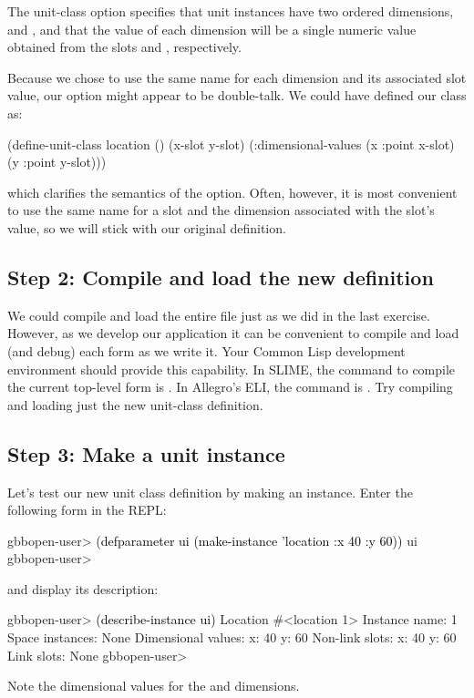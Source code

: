 \documentclass[10pt,twoside,english,pdftex]{article}
\begin{document}
The  unit-class option specifies that
 unit instances have two ordered dimensions, 
and , and that the value of each dimension will be a single
numeric value obtained from the slots  and ,
respectively.

Because we chose to use the same name for each dimension and its
associated slot value, our  option might
appear to be double-talk.  We could have defined our class as:
%
\W\supp
\begin{example}
\textcolor{darkergray}{%
  (define-unit-class location ()
    (x-slot y-slot)
    (:dimensional-values
      (x :point x-slot)
      (y :point y-slot)))}
\end{example}
%
which clarifies the semantics of the 
option.  Often, however, it is most convenient to use the same name
for a slot and the dimension associated with the slot's value, so we
will stick with our original definition.

\subsection*{Step 2: Compile and load the new definition}

We could compile and load the entire  file
just as we did in the last exercise.  However, as we develop our
application it can be convenient to compile and load (and debug) each
form as we write it.  Your Common Lisp development environment should
provide this capability.  In SLIME, the command to compile the current
top-level form is .  In Allegro's ELI, the command is
.  Try compiling and loading just the new
 unit-class definition.

\subsection*{Step 3: Make  a  unit instance}

%
%
Let's test our new  unit class definition by making an
instance.  Enter the following form in the REPL:
%
\W\supp
\begin{example}
\textcolor{darkergray}{%
  gbbopen-user> \textcolor{black}{(defparameter ui (make-instance 'location :x 40 :y 60))}
  ui
  gbbopen-user>}
\end{example}
%
%
and display its description:
%
\W\supp\notpretop
\begin{example}
\textcolor{darkergray}{%
  gbbopen-user> \textcolor{black}{(describe-instance ui)}
  Location #<location 1>
    Instance name: 1
    Space instances: None
    Dimensional values:
      x:  40
      y:  60
    Non-link slots:
      x:  40
      y:  60
    Link slots: None
  gbbopen-user>}
\end{example}
%
Note the dimensional values for the  and  dimensions.
\end{document}
